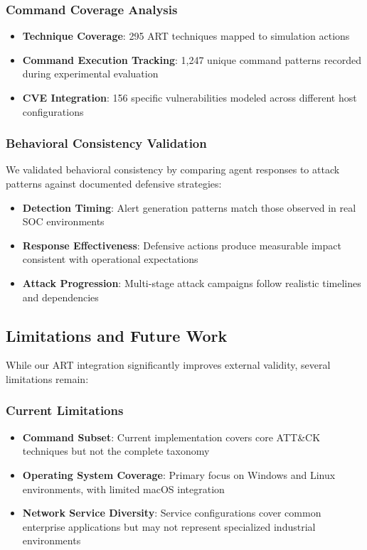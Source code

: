 \subsubsection{Command Coverage Analysis}

\begin{itemize}
    \item \textbf{Technique Coverage}: 295 ART techniques mapped to simulation actions
    \item \textbf{Command Execution Tracking}: 1,247 unique command patterns recorded during experimental evaluation
    \item \textbf{CVE Integration}: 156 specific vulnerabilities modeled across different host configurations
\end{itemize}

\subsubsection{Behavioral Consistency Validation}

We validated behavioral consistency by comparing agent responses to attack patterns against documented defensive strategies:

\begin{itemize}
    \item \textbf{Detection Timing}: Alert generation patterns match those observed in real SOC environments
    \item \textbf{Response Effectiveness}: Defensive actions produce measurable impact consistent with operational expectations
    \item \textbf{Attack Progression}: Multi-stage attack campaigns follow realistic timelines and dependencies
\end{itemize}

\subsection{Limitations and Future Work}

While our ART integration significantly improves external validity, several limitations remain:

\subsubsection{Current Limitations}

\begin{itemize}
    \item \textbf{Command Subset}: Current implementation covers core ATT\&CK techniques but not the complete taxonomy
    \item \textbf{Operating System Coverage}: Primary focus on Windows and Linux environments, with limited macOS integration
    \item \textbf{Network Service Diversity}: Service configurations cover common enterprise applications but may not represent specialized industrial environments
\end{itemize}

